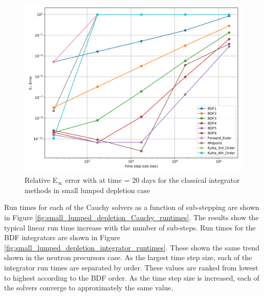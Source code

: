 \clearpage

\begin{figure}[p]
    \centering
    \includegraphics[width=5in]{images/chapter-5/caseStudies/smallLumpedDepletion/msrSmallLumpedDepletionEinfErrorerrorIntegrators.png}
    \caption{Relative E$_{\infty}$ error with at time = 20 days for the classical integrator methods in small lumped depletion case}
    \label{fig:small_lumped_depletion_Einf_integrators}
\end{figure}

\clearpage


Run times for each of the Cauchy solvers as a function of sub-stepping are shown in Figure \ref{fig:small_lumped_depletion_Cauchy_runtimes}. The results show the typical linear run time increase with the number of sub-steps. Run times for the BDF integrators are shown in Figure \ref{fig:small_lumped_depletion_integrator_runtimes}. These shown the same trend shown in the neutron precursors case. As the largest time step size, each of the integrator run times are separated by order. These values are ranked from lowest to highest according to the BDF order. As the time step size is increased, each of the solvers converge to approximately the same value.  

